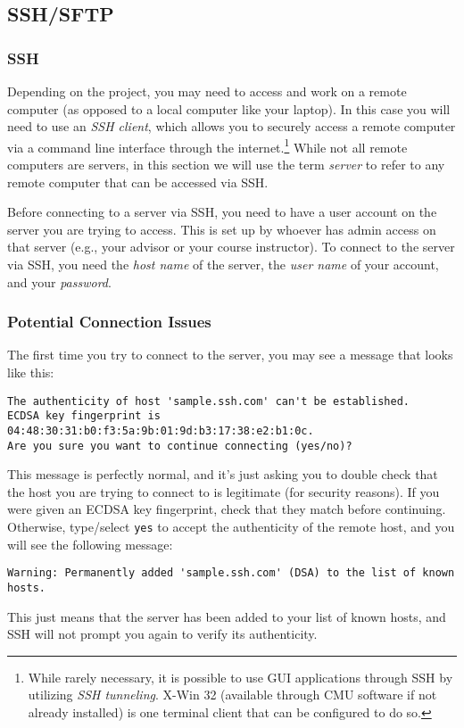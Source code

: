\documentclass[12pt]{article}
\begin{document}
\subsection{SSH/SFTP}
\subsubsection{SSH}
Depending on the project, you may need to access and work on a remote computer (as opposed to a local computer like your laptop).
In this case you will need to use an \emph{SSH client}, which allows you to securely access a remote computer via a command line interface through the internet.\footnote{
    While rarely necessary, it is possible to use GUI applications through SSH by utilizing \emph{SSH tunneling}.
    X-Win 32 (available through CMU software if not already installed) is one terminal client that can be configured to do so.
}
While not all remote computers are servers, in this section we will use the term \emph{server} to refer to any remote computer that can be accessed via SSH.

Before connecting to a server via SSH, you need to have a user account on the server you are trying to access.
This is set up by whoever has admin access on that server (e.g., your advisor or your course instructor).
To connect to the server via SSH, you need the \emph{host name} of the server, the \emph{user name} of your account, and your \emph{password}.

\subsubsection{Potential Connection Issues}
The first time you try to connect to the server, you may see a message that looks like this:
\begin{verbatim}
The authenticity of host 'sample.ssh.com' can't be established.
ECDSA key fingerprint is 04:48:30:31:b0:f3:5a:9b:01:9d:b3:17:38:e2:b1:0c.
Are you sure you want to continue connecting (yes/no)?
\end{verbatim}
This message is perfectly normal, and it's just asking you to double check that the host you are trying to connect to is legitimate (for security reasons).
If you were given an ECDSA key fingerprint, check that they match before continuing.
Otherwise, type/select \texttt{yes} to accept the authenticity of the remote host, and you will see the following message:
\begin{verbatim}
Warning: Permanently added 'sample.ssh.com' (DSA) to the list of known hosts.
\end{verbatim}
This just means that the server has been added to your list of known hosts, and SSH will not prompt you again to verify its authenticity.
\end{document}
